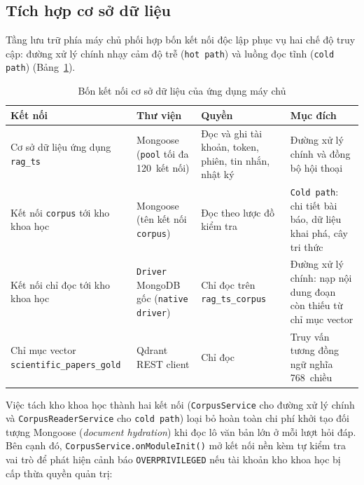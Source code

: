 \subsection{Tích hợp cơ sở dữ liệu}
\label{subsec:tich-hop-csdl}

Tầng lưu trữ phía máy chủ phối hợp bốn kết nối độc lập phục vụ hai chế độ truy cập: đường xử lý chính nhạy cảm độ trễ (\texttt{hot path}) và luồng đọc tĩnh (\texttt{cold path}) (Bảng~\ref{tab:bon-ket-noi-csdl}).

\begin{table}[htbp]
\centering
\caption{Bốn kết nối cơ sở dữ liệu của ứng dụng máy chủ}
\label{tab:bon-ket-noi-csdl}
\footnotesize
\setlength{\tabcolsep}{4pt}
\begin{tabularx}{\textwidth}{
  >{\raggedright\arraybackslash}p{3.4cm}
  >{\raggedright\arraybackslash}p{3.4cm}
  >{\raggedright\arraybackslash}p{3.8cm}
  >{\raggedright\arraybackslash}X
}
\toprule
\textbf{Kết nối} & \textbf{Thư viện} & \textbf{Quyền} & \textbf{Mục đích} \\
\midrule
Cơ sở dữ liệu ứng dụng \texttt{rag\_ts} & Mongoose (\texttt{pool} tối đa 120~kết nối) & Đọc và ghi tài khoản, token, phiên, tin nhắn, nhật ký & Đường xử lý chính và đồng bộ hội thoại \\
\midrule
Kết nối \texttt{corpus} tới kho khoa học & Mongoose (tên kết nối \texttt{corpus}) & Đọc theo lược đồ kiểm tra & \texttt{Cold path}: chi tiết bài báo, dữ liệu khai phá, cây tri thức \\
\midrule
Kết nối chỉ đọc tới kho khoa học & \texttt{Driver} MongoDB gốc (\texttt{native driver}) & Chỉ đọc trên \texttt{rag\_\allowbreak{}ts\_\allowbreak{}corpus} & Đường xử lý chính: nạp nội dung đoạn còn thiếu từ chỉ mục vector \\
\midrule
Chỉ mục vector \texttt{scientific\_\allowbreak{}papers\_\allowbreak{}gold} & Qdrant REST client & Chỉ đọc & Truy vấn tương đồng ngữ nghĩa 768~chiều \\
\bottomrule
\end{tabularx}
\end{table}

Việc tách kho khoa học thành hai kết nối (\texttt{CorpusService} cho đường xử lý chính và \texttt{CorpusReaderService} cho \texttt{cold path}) loại bỏ hoàn toàn chi phí khởi tạo đối tượng Mongoose (\textit{document hydration}) khi đọc lô văn bản lớn ở mỗi lượt hỏi đáp. Bên cạnh đó, \texttt{CorpusService.\allowbreak{}onModuleInit()} mở kết nối nền kèm tự kiểm tra vai trò để phát hiện cảnh báo \texttt{OVERPRIVILEGED} nếu tài khoản kho khoa học bị cấp thừa quyền quản trị:

